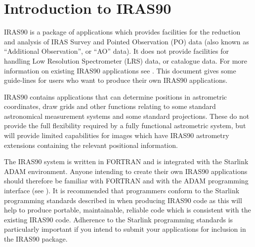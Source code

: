 \stardocabstract
 \newpage
 \begin{latexonly}
   \setlength{\parskip}{0mm}
   \latexonlytoc
   \setlength{\parskip}{\medskipamount}
   \markright{\stardocname}
 \end{latexonly}
\newpage
\renewcommand{\thepage}{\arabic{page}}
\setcounter{page}{1}

\section{Introduction to IRAS90}

{\small IRAS90} is a package of applications which provides facilities
for the reduction and analysis of {\small IRAS} Survey and Pointed
Observation (PO) data (also known as ``Additional Observation'', or
``AO'' data). It does not provide facilities for handling Low
Resolution Spectrometer (LRS) data, or catalogue data. For more
information on existing {\small IRAS90} applications see
.  This
document gives some guide-lines for users who want to produce their own
{\small IRAS90} applications.

{\small IRAS90} contains applications that can determine positions in 
astrometric coordinates, draw grids and other functions relating to some 
standard astronomical measurement systems and some standard projections. These 
do not provide the full flexibility required by a fully functional astrometric
system, but will provide limited capabilities for images which have {\small 
IRAS90} astrometry extensions containing the relevant positional information.

The {\small IRAS90} system is written in {\small FORTRAN} and is
integrated with the Starlink {\small ADAM} environment. Anyone
intending to create their own {\small IRAS90} applications should
therefore be familiar with {\small FORTRAN} and with the {\small ADAM}
programming interface
(see ). It is recommended that programmers
conform to the Starlink programming standards described in
 when
producing {\small IRAS90} code as this will help to produce portable,
maintainable, reliable code which is consistent with the existing
{\small IRAS90} code. Adherence to the Starlink programming standards
is particularly important if you intend to submit your applications for
inclusion in the {\small IRAS90} package. 

